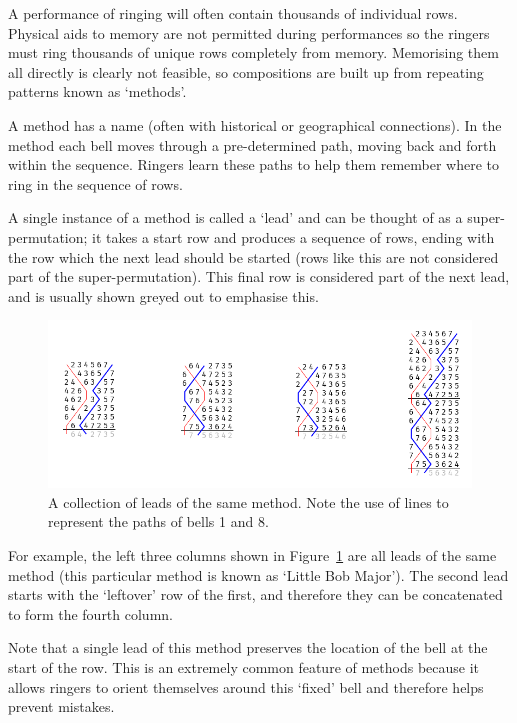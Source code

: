\documentclass[12pt]{article}
\begin{document}
A performance of ringing will often contain thousands of individual rows.  Physical aids to memory
are not permitted during performances so the ringers must ring thousands of unique rows completely
from memory.  Memorising them all directly is clearly not feasible, so compositions are built up
from repeating patterns known as `methods'.

A method has a name (often with historical or geographical connections). In the method each bell
moves through a pre-determined path, moving back and forth within the sequence. Ringers learn these
paths to help them remember where to ring in the sequence of rows.

A single instance of a method is called a `lead' and can be thought of as a super-permutation; it
takes a start row and produces a sequence of rows, ending with the row which the next lead should be
started (rows like this are not considered part of the super-permutation).  This final row is
considered part of the next lead, and is usually shown greyed out to emphasise this.

\begin{figure}[h!]
    \includegraphics[width=\textwidth]{lb8}
    \caption{A collection of leads of the same method.  Note the use of lines to represent the
    paths of bells 1 and 8.}\label{fig:little-bob}
\end{figure}

For example, the left three columns shown in Figure~\ref{fig:little-bob} are all leads of the same
method (this particular method is known as `Little Bob Major').  The second lead starts with the
`leftover' row of the first, and therefore they can be concatenated to form the fourth column.

Note that a single lead of this method preserves the location of the bell at the start of the
row.  This is an extremely common feature of methods because it allows ringers to orient
themselves around this `fixed' bell and therefore helps prevent mistakes.
\end{document}
